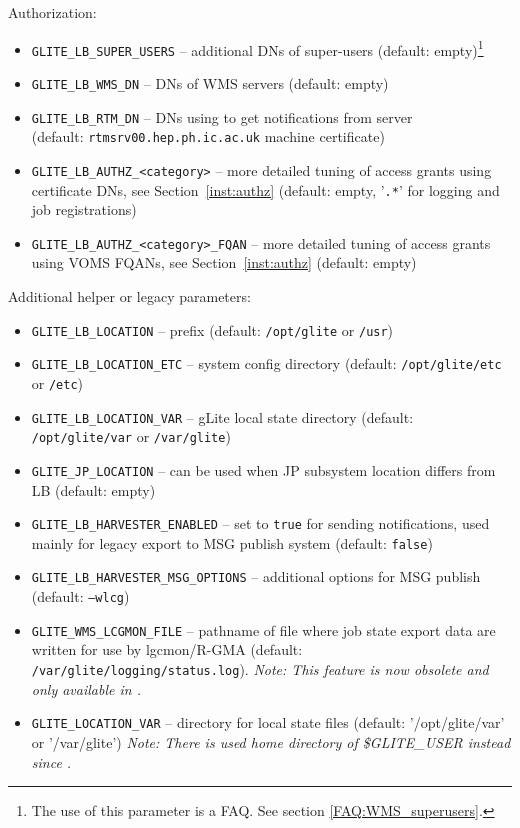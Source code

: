 Authorization:
\begin{itemize}
\item \texttt{GLITE\_LB\_SUPER\_USERS} -- additional DNs of super-users (default: empty)\footnote{The use of this parameter is a FAQ. See section \ref{FAQ:WMS_superusers}.}
\item \texttt{GLITE\_LB\_WMS\_DN} -- DNs of WMS servers (default: empty)\footnotemark[\thefootnote]
\item \texttt{GLITE\_LB\_RTM\_DN} -- DNs using to get notifications from \LB server\\
(default: \texttt{rtmsrv00.hep.ph.ic.ac.uk} machine certificate)
\item \texttt{GLITE\_LB\_AUTHZ\_<category>} -- more detailed tuning of access grants using certificate DNs, see Section~\ref{inst:authz} (default: empty, '\texttt{.*}' for logging and job registrations)
\item \texttt{GLITE\_LB\_AUTHZ\_<category>\_FQAN} -- more detailed tuning of access grants using VOMS FQANs, see Section~\ref{inst:authz} (default: empty)
\end{itemize}

Additional helper or legacy parameters:
\begin{itemize}
\item \texttt{GLITE\_LB\_LOCATION} -- \LB prefix (default: \texttt{/opt/glite} or \texttt{/usr})
\item \texttt{GLITE\_LB\_LOCATION\_ETC} -- system config directory (default: \texttt{/opt/glite/etc} or \texttt{/etc})
\item \texttt{GLITE\_LB\_LOCATION\_VAR} -- gLite local state directory (default: \texttt{/opt/glite/var} or \texttt{/var/glite})
\item \texttt{GLITE\_JP\_LOCATION} -- can be used when JP subsystem location differs from LB (default: empty)
\item \texttt{GLITE\_LB\_HARVESTER\_ENABLED} -- set to \texttt{true} for sending notifications, used mainly for legacy export to MSG publish system (default: \texttt{false})
\item \texttt{GLITE\_LB\_HARVESTER\_MSG\_OPTIONS} -- additional options for MSG publish (default: \texttt{--wlcg})
\item \texttt{GLITE\_WMS\_LCGMON\_FILE} -- pathname of file where job state
export data are written for use by lgcmon/R-GMA 
(default: \texttt{/var/glite/logging/status.log}). \emph{Note: This feature is now obsolete and only available in .}
\item \texttt{GLITE\_LOCATION\_VAR} -- directory for local state files (default: '/opt/glite/var' or '/var/glite') \emph{Note: There is used home directory of \$GLITE\_USER instead since .}
\end{itemize}


